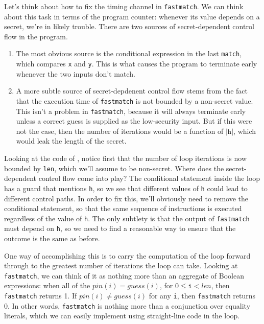 \documentclass[11pt,twoside]{scrartcl}
\begin{document}
Let's think about how to fix the timing channel in \texttt{fastmatch}. We can think about this task in terms of the program counter: whenever its value depends on a secret, we're in likely trouble. There are two sources of secret-dependent control flow in the program.
\begin{enumerate}
\item The most obvious source is the conditional expression in the last \texttt{match}, which compares \texttt{x} and \texttt{y}. This is what causes the program to terminate early whenever the two inputs don't match.
\item A more subtle source of secret-depdenent control flow stems from the fact that the execution time of \texttt{fastmatch} is not bounded by a non-secret value. This isn't a problem in \texttt{fastmatch}, because it will always terminate early unless a correct guess is supplied as the low-security input. But if this were not the case, then the number of iterations would be a function of $|\mathtt{h}|$, which would leak the length of the secret.
\end{enumerate}

Looking at the code of , notice first that the number of loop iterations is now bounded by \texttt{len}, which we'll assume to be non-secret. Where does the secret-dependent control flow come into play? The conditional statement inside the loop has a guard that mentions \texttt{h}, so we see that different values of \texttt{h} could lead to different control paths. In order to fix this, we'll obviously need to remove the conditional statement, so that the same sequence of instructions is executed regardless of the value of \texttt{h}. The only subtlety is that the output of \texttt{fastmatch} must depend on \texttt{h}, so we need to find a reasonable way to ensure that the outcome is the same as before.

One way of accomplishing this is to carry the computation of the loop forward through to the greatest number of iterations the loop can take. Looking at \texttt{fastmatch}, we can think of it as nothing more than an aggregate of Boolean expressions: when all of the $\mathit{pin}(i) = \mathit{guess}(i)$, for $0 \le \mathtt{i} < \mathit{len}$, then \texttt{fastmatch} returns 1. If $\mathit{pin}(i) \ne \mathit{guess}(i)$ for any \texttt{i}, then \texttt{fastmatch} returns 0. In other words, \texttt{fastmatch} is nothing more than a conjunction over equality literals, which we can easily implement using straight-line code in the loop.
\\[-1ex]
\end{document}
